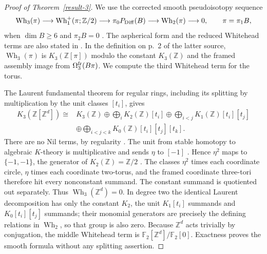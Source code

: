 \documentclass[11pt,a4paper]{article}
\theoremstyle{definition}
\newcommand{\Z}{\mathbb Z}
\newcommand{\F}{\mathbb F}
\begin{document}
\begin{proof}[Proof of Theorem~\ref{result-3}]
We use the corrected smooth pseudoisotopy sequence
\[
 \operatorname{Wh}_3(\pi)\longrightarrow
 \operatorname{Wh}_1^+(\pi;\Z/2)\longrightarrow
 \pi_0P_{\rm Diff}(B)\longrightarrow
 \operatorname{Wh}_2(\pi)\longrightarrow0,
 \qquad \pi=\pi_1B,
\]
when $\dim B\geq6$ and $\pi_2B=0$
\cite[Theorem~8.a.2, pp.~149--150]{Igusa1984}.
The aspherical form and the reduced Whitehead terms are also stated in
\cite[Theorem~7.1, p.~23; Remark~7.3, p.~26]{Igusa2025}.
In the definition on p.~2 of the latter source,
$\operatorname{Wh}_3(\pi)$ is $K_3(\Z[\pi])$ modulo the constant
$K_3(\Z)$ and the framed assembly image from
$\Omega^{\rm fr}_3(B\pi)$. We compute the third Whitehead term for the torus.

The Laurent fundamental theorem for regular rings, including its
splitting by multiplication by the unit classes $[t_i]$, gives
\[
\begin{split}
K_3(\Z[\Z^d])\cong{}&K_3(\Z)
 \oplus\bigoplus_iK_2(\Z)[t_i]
 \oplus\bigoplus_{i<j}K_1(\Z)[t_i][t_j]\\
 &\oplus\bigoplus_{i<j<k}K_0(\Z)[t_i][t_j][t_k].
\end{split}
\]
There are no Nil terms, by regularity
\cite[Theorem~6.3, Corollary~6.3.1, p.~40; Theorem~8.2, p.~61]{WeibelV}.
The unit from stable homotopy to algebraic $K$-theory is
multiplicative and sends $\eta$ to $[-1]$
\cite[Exercise~1.12, pp.~15--16; Corollary~1.20, p.~13]{WeibelIV}.
Hence $\eta^2$ maps to $\{-1,-1\}$, the generator of
$K_2(\Z)=\Z/2$ \cite[Example~5.2.2, p.~36]{WeibelIII}.
The classes $\eta^2$ times each coordinate circle, $\eta$ times
each coordinate two-torus, and the framed coordinate three-tori
therefore hit every nonconstant summand. The constant summand
is quotiented out separately. Thus
$\operatorname{Wh}_3(\Z^d)=0$. In degree two the identical
Laurent decomposition has only the constant $K_2$, the unit
$K_1[t_i]$ summands and $K_0[t_i][t_j]$ summands; their
monomial generators are precisely the defining relations in
$\operatorname{Wh}_2$, so that group is also zero.
Because $\Z^d$ acts trivially by conjugation, the middle
Whitehead term is $\F_2[\Z^d]/\F_2[0]$. Exactness proves the
smooth formula without any splitting assertion.


\end{proof}
\end{document}
